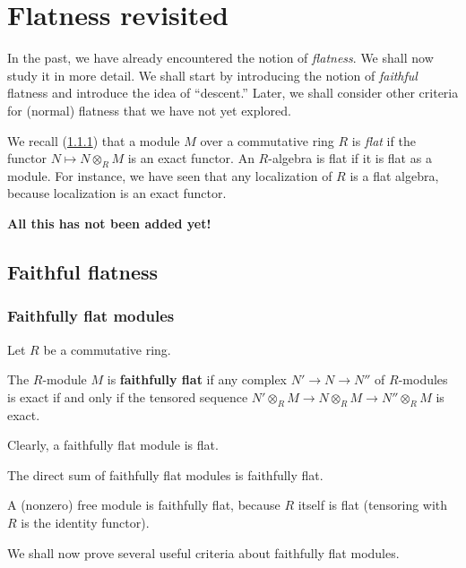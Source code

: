 \chapter{Flatness revisited}

In the past, we have already encountered the notion of \emph{flatness}. We
shall now study it in more detail.
We shall start by introducing the notion of \emph{faithful} flatness and
introduce the idea of ``descent.'' Later, we shall consider other criteria for
(normal) flatness that we have not yet explored.

We recall (\cref{}) that a module $M$ over a commutative ring $R$ is
\emph{flat} if the functor $N \mapsto N \otimes_R M$ is an exact functor. An
$R$-algebra is flat if it is flat as a module. For instance, we have seen that
any localization of $R$ is a flat algebra, because localization is an exact
functor.

\textbf{All this has not been added yet!}

\section{Faithful flatness}



\subsection{Faithfully flat modules}
Let $R$ be a commutative ring.

\begin{definition} 
The $R$-module $M$ is \textbf{faithfully flat} if  any complex $N' \to N
\to N''$ of $R$-modules is exact if and only if the tensored sequence $N'
\otimes_R M \to N \otimes_R M \to N'' \otimes_R M$ is exact.
\end{definition} 

Clearly, a faithfully flat module is flat.


\begin{example} 
The direct sum of faithfully flat modules is faithfully flat.
\end{example} 
\begin{example} 
A (nonzero)  free module is faithfully flat, because $R$ itself is flat
(tensoring with $R$ is the identity functor).
\end{example} 

We shall now prove several useful criteria about faithfully flat modules.

